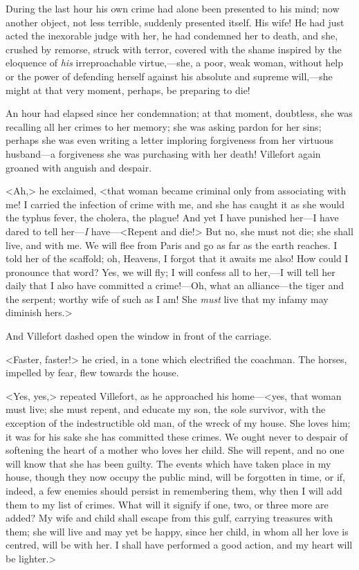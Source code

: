  During the last hour his own crime had alone been presented to his mind; now another object, not less terrible, suddenly presented itself. His wife! He had just acted the inexorable judge with her, he had condemned her to death, and she, crushed by remorse, struck with terror, covered with the shame inspired by the eloquence of \textit{his} irreproachable virtue,—she, a poor, weak woman, without help or the power of defending herself against his absolute and supreme will,—she might at that very moment, perhaps, be preparing to die! 

 An hour had elapsed since her condemnation; at that moment, doubtless, she was recalling all her crimes to her memory; she was asking pardon for her sins; perhaps she was even writing a letter imploring forgiveness from her virtuous husband—a forgiveness she was purchasing with her death! Villefort again groaned with anguish and despair. 

 <Ah,> he exclaimed, <that woman became criminal only from associating with me! I carried the infection of crime with me, and she has caught it as she would the typhus fever, the cholera, the plague! And yet I have punished her—I have dared to tell her—\textit{I} have—<Repent and die!> But no, she must not die; she shall live, and with me. We will flee from Paris and go as far as the earth reaches. I told her of the scaffold; oh, Heavens, I forgot that it awaits me also! How could I pronounce that word? Yes, we will fly; I will confess all to her,—I will tell her daily that I also have committed a crime!—Oh, what an alliance—the tiger and the serpent; worthy wife of such as I am! She \textit{must} live that my infamy may diminish hers.> 

 And Villefort dashed open the window in front of the carriage. 

 <Faster, faster!> he cried, in a tone which electrified the coachman. The horses, impelled by fear, flew towards the house. 

 <Yes, yes,> repeated Villefort, as he approached his home—<yes, that woman must live; she must repent, and educate my son, the sole survivor, with the exception of the indestructible old man, of the wreck of my house. She loves him; it was for his sake she has committed these crimes. We ought never to despair of softening the heart of a mother who loves her child. She will repent, and no one will know that she has been guilty. The events which have taken place in my house, though they now occupy the public mind, will be forgotten in time, or if, indeed, a few enemies should persist in remembering them, why then I will add them to my list of crimes. What will it signify if one, two, or three more are added? My wife and child shall escape from this gulf, carrying treasures with them; she will live and may yet be happy, since her child, in whom all her love is centred, will be with her. I shall have performed a good action, and my heart will be lighter.> 

